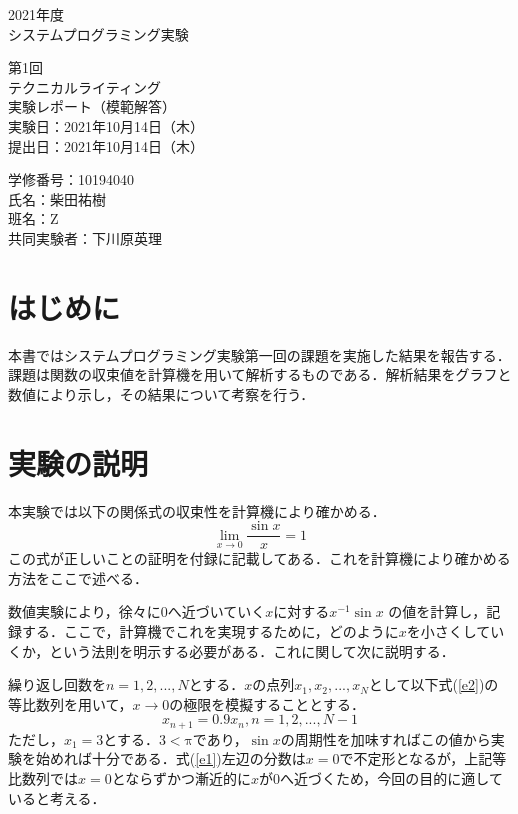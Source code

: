 \documentclass[fleqn, a4paper. 12pt]{ltjsarticle} %
\begin{document}
\begin{titlepage}
      \begin{center}
      {
      \Huge 2021年度\\システムプログラミング実験}
      
      \vspace{4cm}
             {\Huge 第1回\\テクニカルライティング\\
               実験レポート（模範解答）\\}
             \vspace{4cm}
                    {\large 実験日：2021年10月14日（木）\\提出日：2021年10月14日（木）\\}
                    
                    {\large 学修番号：10194040\\氏名：柴田祐樹\\班名：Z\\ 共同実験者：下川原英理}
    \end{center}  
  \end{titlepage}
  
    \section{はじめに}
    本書ではシステムプログラミング実験第一回の課題を実施した結果を報告する．課題は関数の収束値を計算機を用いて解析するものである．解析結果をグラフと数値により示し，その結果について考察を行う．

    \section{実験の説明}
    本実験では以下の関係式の収束性を計算機により確かめる．
    \begin{equation}
        \label{e1}
        \lim_{x\to 0} \frac{\sin x}{x} = 1
    \end{equation}
    この式が正しいことの証明を付録に記載してある．これを計算機により確かめる方法をここで述べる．
    
    数値実験により，徐々に$0$へ近づいていく$x$に対する$x^{-1}\sin x$ の値を計算し，記録する．ここで，計算機でこれを実現するために，どのように$x$を小さくしていくか，という法則を明示する必要がある．これに関して次に説明する．
    
    繰り返し回数を$n = 1, 2, ..., N$とする．$x$の点列$x_1, x_2, ..., x_N$として以下式(\ref{e2})の等比数列を用いて，$x\to 0$の極限を模擬することとする．
    \begin{equation}
        \label{e2}
        x_{n+1} = 0.9 x_{n}, n=1,2,..., N-1
    \end{equation}
    ただし，$x_1 = 3$とする．$3<\mathrm{\pi}$であり，$\sin x$の周期性を加味すればこの値から実験を始めれば十分である．式(\ref{e1})左辺の分数は$x=0$で不定形となるが，上記等比数列では$x=0$とならずかつ漸近的に$x$が$0$へ近づくため，今回の目的に適していると考える．
\end{document}
